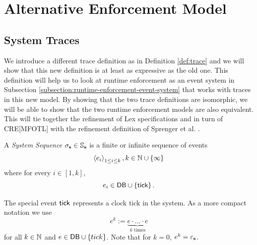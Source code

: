 \section{Alternative Enforcement Model}
\label{section:updated-enforcement-model}

\subsection{System Traces}
\label{subsection:system-traces}
We introduce a different trace definition as in Definition \ref{def:trace}
and we will show that this new definition is at least as expressive as
the old one.
This definition will help us to look at runtime enforcement
as an event system in Subsection
\ref{subsection:runtime-enforcement-event-system} that
works with traces in this new model.
By showing that the two trace definitions are isomorphic,
we will be able to show that the two
runtime enforcement models are also equivalent.
This will tie together the refinement of Lex specifications
and in turn of CRE[MFOTL] with the refinement
definition of Sprenger et al. \cite{igloo}.

\begin{definition}
    \label{def:system-sequence}
    A \emph{System Sequence} $\sigma_\sys \in \SeqSys$ 
    is a finite or infinite sequence of events
    \begin{equation*}
        \Sequence[1 \leq i \leq k]{e_i},
        k \in \Nat \cup \lbrace \infty \rbrace
    \end{equation*}
    where for every $i \in [1, k]$,
    \begin{equation*}
        e_i \in  \Databases \cup \left\{ \tick \right\}.
    \end{equation*}
\end{definition}
The special event $\tick$ represents a clock tick in the system.
As a more compact notation we use
$$e^k := \underbrace{e \cdot \ldots \cdot e}_{k \text{ times}}$$ for all $k \in \Nat$
and $e \in \Databases \cup \{tick\}$. Note that for $k=0$, $e^k = \emptytrace_\sys$.

